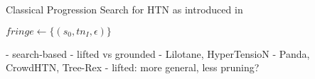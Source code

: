 \begin{algorithm}
	\caption{Classical Progression Search for HTN as introduced in \cite{holler2020htn}}
	$fringe \gets \{ (s_0, tn_I, \epsilon)\}$\;
\end{algorithm}

- search-based
- lifted vs grounded
	- Lilotane, HyperTensioN
	- Panda, CrowdHTN, Tree-Rex
	- lifted: more general, less pruning?